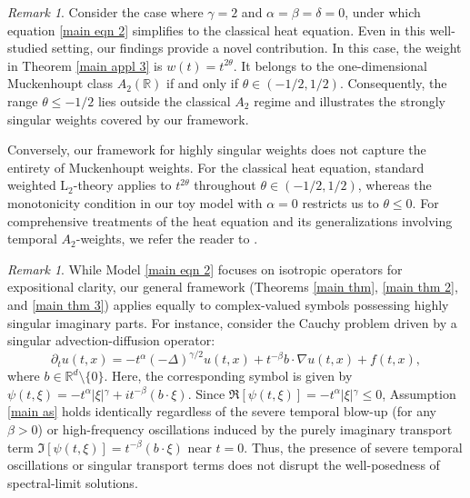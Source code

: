 \documentclass[11pt,reqno]{amsart}
\theoremstyle{definition}
\theoremstyle{remark}
\newtheorem{rem}[thm]{Remark}
\newcommand\bR{\mathbb{R}}
\numberwithin{equation}{section}
\begin{document}
\begin{rem}
Consider the case where $\gamma = 2$ and $\alpha=\beta=\delta=0$, under which equation \eqref{main eqn 2} simplifies to the classical heat equation. Even in this well-studied setting, our findings provide a novel contribution. 
In this case, the weight in Theorem \ref{main appl 3} is $w(t)=t^{2\theta}$. It belongs to the one-dimensional Muckenhoupt class $A_2(\bR)$ if and only if $\theta\in(-1/2,1/2)$. 
Consequently, the range $\theta\leq-1/2$ lies outside the classical $A_2$ regime and illustrates the strongly singular weights covered by our framework.

Conversely, our framework for highly singular weights does not capture the entirety of Muckenhoupt weights. 
For the classical heat equation, standard weighted $\mathrm{L}_2$-theory applies to $t^{2\theta}$ throughout $\theta\in(-1/2,1/2)$, whereas the monotonicity condition in our toy model with $\alpha=0$ restricts us to $\theta\leq0$. 
For comprehensive treatments of the heat equation and its generalizations involving temporal $A_2$-weights, we refer the reader to \cite{PS1,MV1,CJH KID 2023,DK2,DK3}.
\end{rem}

	
\begin{rem}



While Model \eqref{main eqn 2} focuses on isotropic operators for expositional clarity, our general framework (Theorems \ref{main thm}, \ref{main thm 2}, and \ref{main thm 3}) applies equally to complex-valued symbols possessing highly singular imaginary parts. For instance, consider the Cauchy problem driven by a singular advection-diffusion operator:
  $$
  \partial_t u(t,x) = -t^{\alpha}(-\Delta)^{\gamma/2}u(t,x) +  t^{-\beta} b \cdot \nabla u(t,x) + f(t,x),
  $$
where $b \in \mathbb{R}^d \setminus \{0\}$. Here, the corresponding symbol is given by $\psi(t,\xi) = -t^\alpha \vert{}\xi\vert{}^\gamma + it^{-\beta}(b \cdot \xi)$. 
Since $\Re[\psi(t,\xi)] = -t^\alpha \vert{}\xi\vert{}^\gamma \le 0$, Assumption \ref{main as} holds identically regardless of the severe temporal blow-up (for any $\beta>0$) or high-frequency oscillations induced by the purely imaginary transport term $\Im[\psi(t,\xi)] = t^{-\beta}(b \cdot \xi)$ near $t=0$. 
Thus, the presence of severe temporal oscillations or singular transport terms does not disrupt the well-posedness of spectral-limit solutions.
\end{rem}
\end{document}
